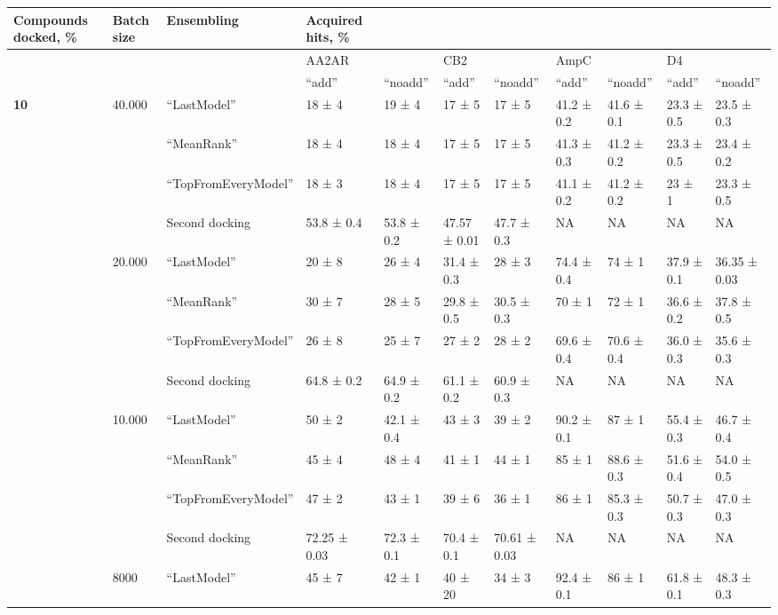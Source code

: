 \begin{tabular}{|l|llllllllll|}
\hline
    \textbf{Compounds docked, \%} & \textbf{Batch size} & \textbf{Ensembling} & \textbf{Acquired hits, \%} & \textbf{} & \textbf{} & \textbf{} & \textbf{} & \textbf{} & \textbf{} & \textbf{} \\ \hline
    \textbf{} & ~ & ~ & AA2AR & ~ & CB2 & ~ & AmpC & ~ & D4 & ~ \\ 
    \textbf{} & ~ & ~ & “add” & “noadd” & “add” & “noadd” & “add” & “noadd” & “add” & “noadd” \\ 
    \textbf{10} & 40.000 & “LastModel” & 18 ± 4 & 19 ± 4 & 17 ± 5 & 17 ± 5 & 41.2 ± 0.2 & 41.6 ± 0.1 & 23.3 ± 0.5 & 23.5 ± 0.3 \\ 
    \textbf{} & ~ & “MeanRank” & 18 ± 4 & 18 ± 4 & 17 ± 5 & 17 ± 5 & 41.3 ± 0.3 & 41.2 ± 0.2 & 23.3 ± 0.5 & 23.4 ± 0.2 \\ 
    \textbf{} & ~ & “TopFromEveryModel” & 18 ± 3 & 18 ± 4 & 17 ± 5 & 17 ± 5 & 41.1 ± 0.2 & 41.2 ± 0.2 & 23 ± 1 & 23.3 ± 0.5 \\ 
    \textbf{} & ~ & Second docking & 53.8 ± 0.4 & 53.8 ± 0.2 & 47.57 ± 0.01 & 47.7 ± 0.3 & NA & NA & NA & NA \\ 
    \textbf{} & 20.000 & “LastModel” & 20 ± 8 & 26 ± 4 & 31.4 ± 0.3 & 28 ± 3 & 74.4 ± 0.4 & 74 ± 1 & 37.9 ± 0.1 & 36.35 ± 0.03 \\ 
    \textbf{} & ~ & “MeanRank” & 30 ± 7 & 28 ± 5 & 29.8 ± 0.5 & 30.5 ± 0.3 & 70 ± 1 & 72 ± 1 & 36.6 ± 0.2 & 37.8 ± 0.5 \\ 
    \textbf{} & ~ & “TopFromEveryModel” & 26 ± 8 & 25 ± 7 & 27 ± 2 & 28 ± 2 & 69.6 ± 0.4 & 70.6 ± 0.4 & 36.0 ± 0.3 & 35.6 ± 0.3 \\ 
    \textbf{} & ~ & Second docking & 64.8 ± 0.2 & 64.9 ± 0.2 & 61.1 ± 0.2 & 60.9 ± 0.3 & NA & NA & NA & NA \\ 
    \textbf{} & 10.000 & “LastModel” & 50 ± 2 & 42.1 ± 0.4 & 43 ± 3 & 39 ± 2 & 90.2 ± 0.1 & 87 ± 1 & 55.4 ± 0.3 & 46.7 ± 0.4 \\ 
    \textbf{} & ~ & “MeanRank” & 45 ± 4 & 48 ± 4 & 41 ± 1 & 44 ± 1 & 85 ± 1 & 88.6 ± 0.3 & 51.6 ± 0.4 & 54.0 ± 0.5 \\ 
    \textbf{} & ~ & “TopFromEveryModel” & 47 ± 2 & 43 ± 1 & 39 ± 6 & 36 ± 1 & 86 ± 1 & 85.3 ± 0.3 & 50.7 ± 0.3 & 47.0 ± 0.3 \\ 
    \textbf{} & ~ & Second docking & 72.25 ± 0.03 & 72.3 ± 0.1 & 70.4 ± 0.1 & 70.61 ± 0.03 & NA & NA & NA & NA \\ 
    \textbf{} & 8000 & “LastModel” & 45 ± 7 & 42 ± 1 & 40 ± 20 & 34 ± 3 & 92.4 ± 0.1 & 86 ± 1 & 61.8 ± 0.1 & 48.3 ± 0.3 \\ 

\end{tabular}
